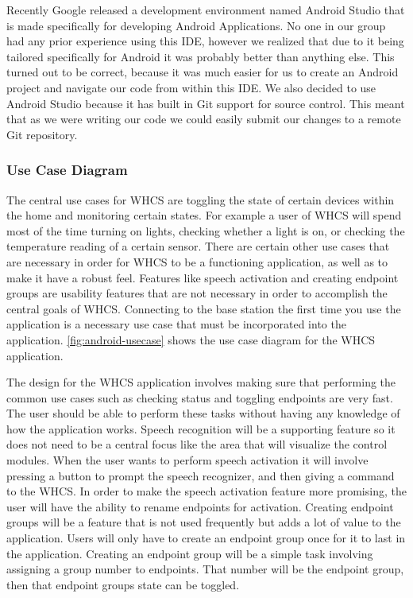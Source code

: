\color{black} Recently Google released a development environment named Android
Studio that is made specifically for developing Android Applications. No one in
our group had any prior experience using this IDE, however we realized that due
to it being tailored specifically for Android it was probably better than
anything else. This turned out to be correct, because it was much easier for us
to create an Android project and navigate our code from within this IDE. We
also decided to use Android Studio because it has built in Git support for
source control. This meant that as we were
writing our code we could easily submit our changes to a remote Git repository.

\subsubsection{Use Case Diagram} The central use cases for WHCS are toggling
the state of certain devices within the home and monitoring certain states.
For example a user of WHCS will spend most of the time turning on lights,
checking whether a light is on, or checking the temperature reading of a
certain sensor. There are certain other use cases that are necessary in order
for WHCS to be a functioning application, as well as to make it have a robust
feel. Features like speech activation and creating endpoint groups are
usability features that are not necessary in order to accomplish the central
goals of WHCS.  Connecting to the base station the first time you use the
application is a necessary use case that must be incorporated into the
application. \autoref{fig:android-usecase} shows the use case diagram for the
WHCS application.

The design for the WHCS application involves making sure that performing the
common use cases such as checking status and toggling endpoints are very fast.
The user should be able to perform these tasks without having any knowledge of
how the application works. Speech recognition will be a supporting feature so
it does not need to be a central focus like the area that will visualize the
control modules. When the user wants to perform speech activation it will
involve pressing a button to prompt the speech recognizer, and then giving a
command to the WHCS. In order to make the speech activation feature more
promising, the user will have the ability to rename endpoints for activation.
Creating endpoint groups will be a feature that is not used frequently but adds
a lot of value to the application. Users will only have to create an endpoint
group once for it to last in the application. Creating an endpoint group will
be a simple task involving assigning a group number to endpoints. That number
will be the endpoint group, then that endpoint groups state can be toggled.

